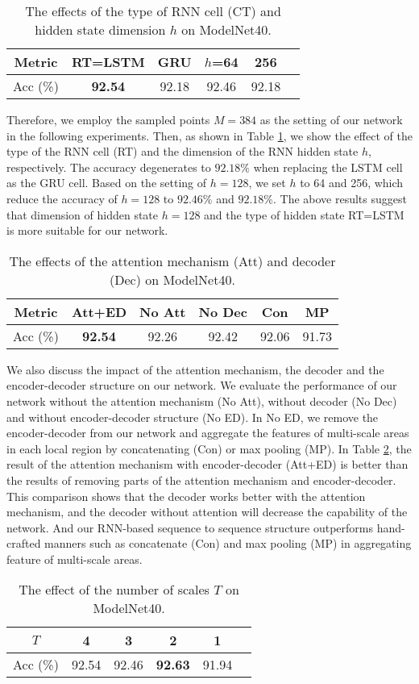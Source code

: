 \documentclass[letterpaper]{article}
\begin{document}
\begin{table}[htp]
\centering
\caption{The effects of the type of RNN cell (CT) and hidden state dimension $h$ on ModelNet40.}
\label{table:rnn}
\begin{tabular}{cccccc}\hline
Metric&RT=LSTM&GRU&$h$=64&256\\ \hline
Acc (\%)&\textbf{92.54}&92.18&92.46&92.18\\ \hline
\end{tabular}
\end{table}
Therefore, we employ the sampled points $M = 384$ as the setting of our network in the following experiments. Then, as shown in Table \ref{table:rnn}, we show the effect of the type of the RNN cell (RT) and the dimension of the RNN hidden state $h$, respectively.
The accuracy degenerates to $92.18\%$ when replacing the LSTM cell as the GRU cell.
Based on the setting of $h = 128$, we set $h$ to 64 and 256, which reduce the accuracy of $h=128$ to $92.46\%$ and $92.18\%$.
The above results suggest that dimension of hidden state $h = 128$ and the type of hidden state RT=LSTM is more suitable for our network.

\begin{table}[htp]
\centering
\caption{The effects of the attention mechanism (Att) and decoder (Dec) on ModelNet40.}
\label{table:att}
\begin{tabular}{cccccc}\hline
Metric&Att+ED&No Att&No Dec &Con &MP \\ \hline
Acc (\%)&\textbf{92.54}&92.26&92.42&92.06 &91.73\\ \hline
\end{tabular}
\end{table}
We also discuss the impact of the attention mechanism, the decoder and the encoder-decoder structure on our network.
We evaluate the performance of our network without the attention mechanism (No Att), without decoder (No Dec) and without encoder-decoder structure (No ED).
In No ED, we remove the encoder-decoder from our network and aggregate the features of multi-scale areas in each local region by concatenating (Con) or max pooling (MP).
In Table \ref{table:att}, the result of the attention mechanism with encoder-decoder (Att+ED) is better than the results of removing parts of the attention mechanism and encoder-decoder.
This comparison shows that the decoder works better with the attention mechanism, and the decoder without attention will decrease the capability of the network.
And our RNN-based sequence to sequence structure outperforms hand-crafted manners such as concatenate (Con) and max pooling (MP) in aggregating feature of multi-scale areas.
\begin{table}[htp]
\centering
\caption{The effect of the number of scales $T$ on ModelNet40.}
\label{table:scales}
\begin{tabular}{cccccc}\hline
$T$&4&3&2&1\\ \hline
Acc (\%)&92.54&92.46&\textbf{92.63}&91.94\\ \hline
\end{tabular}
\end{table}
\end{document}
